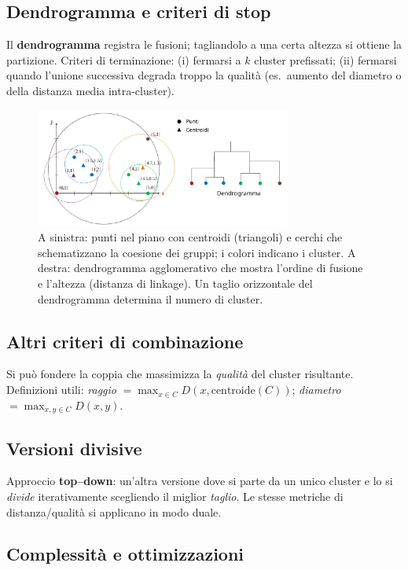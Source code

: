 \subsection{Dendrogramma e criteri di stop}\label{subsec:dendro}
Il \textbf{dendrogramma} registra le fusioni; tagliandolo a una certa altezza si ottiene la partizione.
Criteri di terminazione:
(i) fermarsi a $k$ cluster prefissati;
(ii) fermarsi quando l’unione successiva degrada troppo la qualità (es.\ aumento del diametro o della distanza media intra-cluster).

\begin{figure}
  \centering
  \includegraphics[width=0.75\textwidth]{images/dendograms.png}
  \caption{A sinistra: punti nel piano con centroidi (triangoli) e cerchi che schematizzano la coesione dei gruppi; i colori indicano i cluster. A destra: dendrogramma agglomerativo che mostra l’ordine di fusione e l’altezza (distanza di linkage). Un taglio orizzontale del dendrogramma determina il numero di cluster.}
  \label{fig:dendograms}
\end{figure}

\subsection{Altri criteri di combinazione}\label{subsec:altri-criteri}
Si può fondere la coppia che massimizza la \emph{qualità} del cluster risultante.
Definizioni utili: \emph{raggio} $=\max_{x\in C} D(x,\mathrm{centroide}(C))$; \emph{diametro} $=\max_{x,y\in C} D(x,y)$.

\subsection{Versioni divisive}\label{subsec:divisive}
Approccio \textbf{top–down}: un'altra versione dove si parte da un unico cluster e lo si \emph{divide} iterativamente scegliendo il miglior \emph{taglio}. Le stesse metriche di distanza/qualità si applicano in modo duale.

\subsection{Complessità e ottimizzazioni}\label{subsec:hclust-compl}

